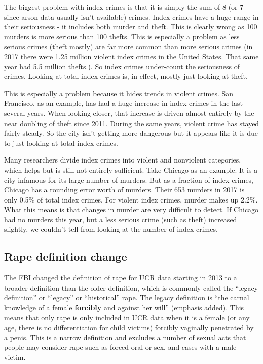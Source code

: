 \documentclass[
  12pt,
  openany]{book}
\begin{document}
The biggest problem with index crimes is that it is simply the sum of 8 (or 7 since arson data usually isn't available) crimes. Index crimes have a huge range in their seriousness - it includes both murder and theft. This is clearly wrong as 100 murders is more serious than 100 thefts. This is especially a problem as less serious crimes (theft mostly) are far more common than more serious crimes (in 2017 there were 1.25 million violent index crimes in the United States. That same year had 5.5 million thefts.). So index crimes under-count the seriousness of crimes. Looking at total index crimes is, in effect, mostly just looking at theft.

This is especially a problem because it hides trends in violent crimes. San Francisco, as an example, has had a huge increase in index crimes in the last several years. When looking closer, that increase is driven almost entirely by the near doubling of theft since 2011. During the same years, violent crime has stayed fairly steady. So the city isn't getting more dangerous but it appears like it is due to just looking at total index crimes.

Many researchers divide index crimes into violent and nonviolent categories, which helps but is still not entirely sufficient. Take Chicago as an example. It is a city infamous for its large number of murders. But as a fraction of index crimes, Chicago has a rounding error worth of murders. Their 653 murders in 2017 is only 0.5\% of total index crimes. For violent index crimes, murder makes up 2.2\%. What this means is that changes in murder are very difficult to detect. If Chicago had no murders this year, but a less serious crime (such as theft) increased slightly, we couldn't tell from looking at the number of index crimes.

\hypertarget{rape-definition-change}{%
\subsection{Rape definition change}\label{rape-definition-change}}

The FBI changed the definition of rape for UCR data starting in 2013 to a broader definition than the older definition, which is commonly called the ``legacy definition'' or ``legacy'' or ``historical'' rape. The legacy definition is ``the carnal knowledge of a female \textbf{forcibly} and against her will'' (emphasis added). This means that only rape is only included in UCR data when it is a female (or any age, there is no differentiation for child victims) forcibly vaginally penetrated by a penis. This is a narrow definition and excludes a number of sexual acts that people may consider rape such as forced oral or sex, and cases with a male victim.
\end{document}
